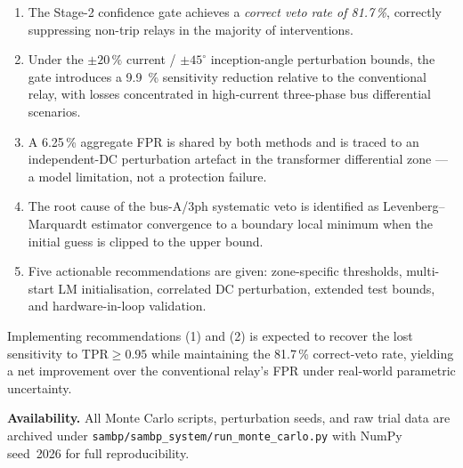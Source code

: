 \documentclass[12pt,a4paper]{article}
\begin{document}
\begin{enumerate}
  \item The Stage-2 confidence gate achieves a \emph{correct veto rate
    of 81.7\,\%}, correctly suppressing non-trip relays in the majority
    of interventions.

  \item Under the $\pm20\,\%$ current / $\pm45^\circ$ inception-angle
    perturbation bounds, the gate introduces a \SI{9.9}{\percent}
    sensitivity reduction relative to the conventional relay, with losses
    concentrated in high-current three-phase bus differential scenarios.

  \item A 6.25\,\% aggregate FPR is shared by both methods and is traced
    to an independent-DC perturbation artefact in the transformer
    differential zone — a model limitation, not a protection failure.

  \item The root cause of the bus-A/3ph systematic veto is identified as
    Levenberg--Marquardt estimator convergence to a boundary local
    minimum when the initial guess is clipped to the upper bound.

  \item Five actionable recommendations are given: zone-specific
    thresholds, multi-start LM initialisation, correlated DC
    perturbation, extended test bounds, and hardware-in-loop
    validation.
\end{enumerate}

Implementing recommendations (1) and (2) is expected to recover the
lost sensitivity to $\mathrm{TPR} \ge 0.95$ while maintaining the
81.7\,\% correct-veto rate, yielding a net improvement over the
conventional relay's FPR under real-world parametric uncertainty.

\bigskip
\noindent\textbf{Availability.}
All Monte Carlo scripts, perturbation seeds, and raw trial data are
archived under \texttt{sambp/sambp\_system/run\_monte\_carlo.py}
with NumPy seed~2026 for full reproducibility.

\newpage


\end{document}
